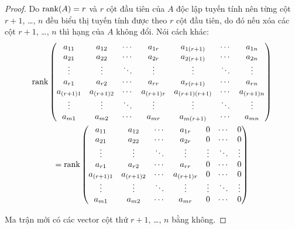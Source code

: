 \begin{proof}
    Do $\text{rank}(A) = r$ và $r$ cột đầu tiên của $A$ độc lập tuyến tính nên từng cột $r+1$, \ldots, $n$ đều biểu thị tuyến tính được theo $r$ cột đầu tiên, do đó nếu xóa các cột $r+1$, \ldots, $n$ thì hạng của $A$ không đổi. Nói cách khác:
    \begin{multline*}
        \text{rank}
        \begin{pmatrix}
            a_{11}     & a_{12}     & \cdots & a_{1r}     & a_{1(r+1)}     & \cdots & a_{1n}     \\
            a_{21}     & a_{22}     & \cdots & a_{2r}     & a_{2(r+1)}     & \cdots & a_{2n}     \\
            \vdots     & \vdots     & \ddots & \vdots     & \vdots         & \ddots & \vdots     \\
            a_{r1}     & a_{r2}     & \cdots & a_{rr}     & a_{r(r+1)}     & \cdots & a_{rn}     \\
            a_{(r+1)1} & a_{(r+1)2} & \cdots & a_{(r+1)r} & a_{(r+1)(r+1)} & \cdots & a_{(r+1)n} \\
            \vdots     & \vdots     & \ddots & \vdots     & \vdots         & \ddots & \vdots     \\
            a_{m1}     & a_{m2}     & \cdots & a_{mr}     & a_{m(r+1)}     & \cdots & a_{mn}
        \end{pmatrix}
        \\ =
        \text{rank}
        \begin{pmatrix}
            a_{11}     & a_{12}     & \cdots & a_{1r}     & 0      & \cdots & 0      \\
            a_{21}     & a_{22}     & \cdots & a_{2r}     & 0      & \cdots & 0      \\
            \vdots     & \vdots     & \ddots & \vdots     & \vdots & \ddots & \vdots \\
            a_{r1}     & a_{r2}     & \cdots & a_{rr}     & 0      & \cdots & 0      \\
            a_{(r+1)1} & a_{(r+1)2} & \cdots & a_{(r+1)r} & 0      & \cdots & 0      \\
            \vdots     & \vdots     & \ddots & \vdots     & \vdots & \ddots & \vdots \\
            a_{m1}     & a_{m2}     & \cdots & a_{mr}     & 0      & \cdots & 0
        \end{pmatrix}
    \end{multline*}
    
    Ma trận mới có các vector cột thứ $r+1$, \ldots, $n$ bằng không.
    

\end{proof}
